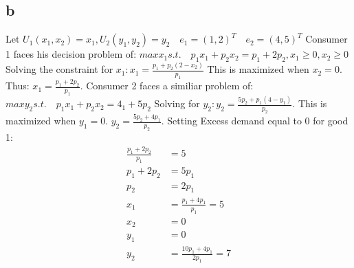 \documentclass[10pt, letterpaper]{paper}
\begin{document}
\subsection*{b}
Let $U_1 (x_1,x_2 ) = x_1, U_2 ( y_1, y_2 ) = y_2 \quad e_1 = (1,2)^T \quad e_2 = (4,5)^T$
\newline
Consumer 1 faces his decision problem of: $max x_1 s.t. \quad p_1 x_1 + p_2 x_2 = p_1+ 2p_2, x_1 \geq 0, x_2 \geq 0$
\newline
Solving the constraint for $x_1: x_1 = \frac{ p_1 + p_2 ( 2- x_2) }{p_1}$ This is maximized when $x_2 = 0.$ Thus: $x_1 = \frac{ p_1 + 2p_2}{p_1}$.
\newline \newline
Consumer 2 faces a similiar problem of: $max y_2 s.t. \quad p_1 x_1 + p_2 x_2 = 4_1 + 5p_2$
\newline
Solving for $y_2: y_2 = \frac{ 5p_2 + p_1 ( 4 - y_1 ) }{p_2}$. This is maximized when $y_1 = 0$. $y_2 = \frac{ 5p_2 +4p_1 }{p_2}$.
\newline \newline
Setting Excess demand equal to 0 for good 1:
\begin{align*}
\frac{ p_1 + 2p_2 }{p_1} &= 5\\
p_1 + 2p_2 &= 5p_1\\
p_2 &= 2 p_1\\
x_1 &= \frac{p_1 + 4p_1 }{p_1} = 5\\
x_2 &= 0\\
y_1 &= 0\\
y_2 &= \frac{ 10p_1 + 4p_1 }{2p_1} = 7\\
\end{align*}
\end{document}
